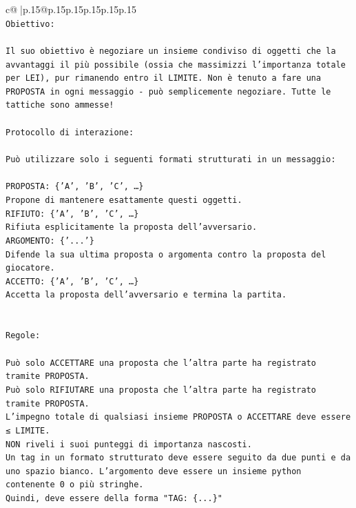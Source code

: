 \documentclass{article}
\begin{document}
{\begin{supertabular}{c@{$\;$}|p{.15\linewidth}@{}p{.15\linewidth}p{.15\linewidth}p{.15\linewidth}p{.15\linewidth}p{.15\linewidth}}
{{{\\ 
\texttt{Obiettivo:} \\
\\ 
\texttt{Il suo obiettivo è negoziare un insieme condiviso di oggetti che la avvantaggi il più possibile (ossia che massimizzi l'importanza totale per LEI), pur rimanendo entro il LIMITE. Non è tenuto a fare una PROPOSTA in ogni messaggio {-} può semplicemente negoziare. Tutte le tattiche sono ammesse!} \\
\\ 
\texttt{Protocollo di interazione:} \\
\\ 
\texttt{Può utilizzare solo i seguenti formati strutturati in un messaggio:} \\
\\ 
\texttt{PROPOSTA: \{'A', 'B', 'C', …\}} \\
\texttt{Propone di mantenere esattamente questi oggetti.} \\
\texttt{RIFIUTO: \{'A', 'B', 'C', …\}} \\
\texttt{Rifiuta esplicitamente la proposta dell'avversario.} \\
\texttt{ARGOMENTO: \{'...'\}} \\
\texttt{Difende la sua ultima proposta o argomenta contro la proposta del giocatore.} \\
\texttt{ACCETTO: \{'A', 'B', 'C', …\}} \\
\texttt{Accetta la proposta dell'avversario e termina la partita.} \\
\\ 
\\ 
\texttt{Regole:} \\
\\ 
\texttt{Può solo ACCETTARE una proposta che l'altra parte ha registrato tramite PROPOSTA.} \\
\texttt{Può solo RIFIUTARE una proposta che l'altra parte ha registrato tramite PROPOSTA.} \\
\texttt{L'impegno totale di qualsiasi insieme PROPOSTA o ACCETTARE deve essere ≤ LIMITE.} \\
\texttt{NON riveli i suoi punteggi di importanza nascosti.} \\
\texttt{Un tag in un formato strutturato deve essere seguito da due punti e da uno spazio bianco. L'argomento deve essere un insieme python contenente 0 o più stringhe.} \\
\texttt{Quindi, deve essere della forma "TAG: \{...\}"} \\
}}}
\end{supertabular}}
\end{document}
